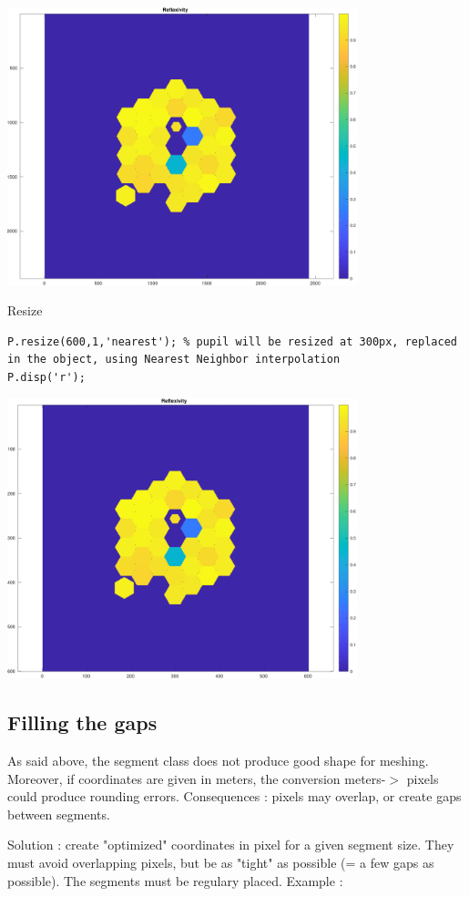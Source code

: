 \documentclass[12pt]{article}
\begin{document}
\includegraphics [width=4in]{docuPupilClass_14.pdf}
\begin{par}
Resize
\end{par} \vspace{1em}
\begin{verbatim}
P.resize(600,1,'nearest'); % pupil will be resized at 300px, replaced in the object, using Nearest Neighbor interpolation
P.disp('r');
\end{verbatim}

\includegraphics [width=4in]{docuPupilClass_15.pdf}


\subsection{Filling the gaps}

\begin{par}
As said above, the segment class does not produce good shape for meshing. Moreover, if coordinates are given in meters, the conversion meters-\ensuremath{>} pixels could produce rounding errors. Consequences : pixels may overlap, or create gaps between segments.
\end{par} \vspace{1em}
\begin{par}
Solution : create "optimized" coordinates in pixel for a given segment size. They must avoid overlapping pixels, but be as "tight" as possible (= a few gaps as possible). The segments must be regulary placed. Example :
\end{par} \vspace{1em}
\end{document}
